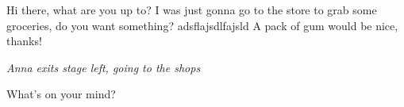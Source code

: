\documentclass{article}
\newcommand\Direction[1]{\end{play}\textit{#1}\begin{play}}
\begin{document}
\begin{play}
\Daniel  Hi there, what are you up to?
\Anna    I was just gonna go to the store to grab some
groceries, do you want something?
\Anna   adsflajsdlfajsld
\Daniel  A pack of gum would be nice, thanks!
\Direction{Anna exits stage left, going to the shops}
\Susan   What's on your mind?
\end{play}
\end{document}
